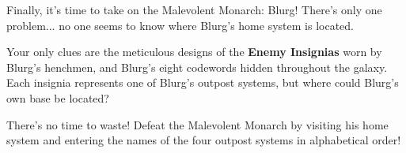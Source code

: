 Finally, it's time to take on the Malevolent Monarch: Blurg!
There's only one problem... no one seems to know where Blurg's
home system is located.

Your only clues are the meticulous designs of the
\textbf{Enemy Insignias} worn by Blurg's henchmen,
and Blurg's eight codewords hidden throughout the galaxy.
Each insignia represents one of Blurg's outpost systems,
but where could Blurg's own base be located?

There's no time to waste! Defeat the Malevolent Monarch
by visiting his home system and entering the names of
the four outpost systems in alphabetical order!
